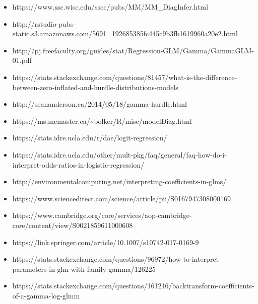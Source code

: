 \documentclass[11pt]{article}
\providecommand{\tightlist}{%
      \setlength{\itemsep}{0pt}\setlength{\parskip}{0pt}}
\begin{document}
    \begin{itemize}
\tightlist
\item
  https://www.ssc.wisc.edu/sscc/pubs/MM/MM\_DiagInfer.html
\item
  http://rstudio-pubs-static.s3.amazonaws.com/5691\_192685385fc445c9b3fb1619960a20e2.html
\item
  http://pj.freefaculty.org/guides/stat/Regression-GLM/Gamma/GammaGLM-01.pdf
\item
  https://stats.stackexchange.com/questions/81457/what-is-the-difference-between-zero-inflated-and-hurdle-distributions-models
\item
  http://seananderson.ca/2014/05/18/gamma-hurdle.html
\item
  https://ms.mcmaster.ca/\textasciitilde{}bolker/R/misc/modelDiag.html
\item
  https://stats.idre.ucla.edu/r/dae/logit-regression/
\item
  https://stats.idre.ucla.edu/other/mult-pkg/faq/general/faq-how-do-i-interpret-odds-ratios-in-logistic-regression/
\item
  http://environmentalcomputing.net/interpreting-coefficients-in-glms/
\item
  https://www.sciencedirect.com/science/article/pii/S0167947308000169
\item
  https://www.cambridge.org/core/services/aop-cambridge-core/content/view/S0021859611000608
\item
  https://link.springer.com/article/10.1007/s10742-017-0169-9
\item
  https://stats.stackexchange.com/questions/96972/how-to-interpret-parameters-in-glm-with-family-gamma/126225
\item
  https://stats.stackexchange.com/questions/161216/backtransform-coefficients-of-a-gamma-log-glmm
\end{itemize}


    
    
    
    
\end{document}
